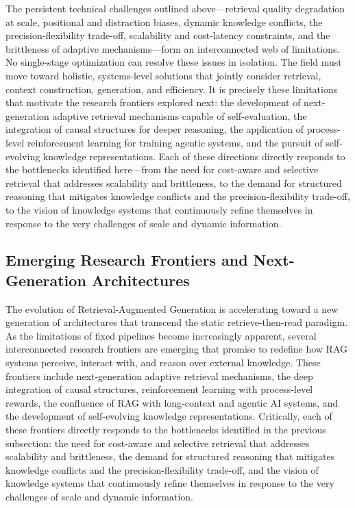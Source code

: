 \documentclass[11pt]{article}
\begin{document}
The persistent technical challenges outlined above---retrieval quality degradation at scale, positional and distraction biases, dynamic knowledge conflicts, the precision-flexibility trade-off, scalability and cost-latency constraints, and the brittleness of adaptive mechanisms---form an interconnected web of limitations. No single-stage optimization can resolve these issues in isolation. The field must move toward holistic, systems-level solutions that jointly consider retrieval, context construction, generation, and efficiency. It is precisely these limitations that motivate the research frontiers explored next: the development of next-generation adaptive retrieval mechanisms capable of self-evaluation, the integration of causal structures for deeper reasoning, the application of process-level reinforcement learning for training agentic systems, and the pursuit of self-evolving knowledge representations. Each of these directions directly responds to the bottlenecks identified here---from the need for cost-aware and selective retrieval that addresses scalability and brittleness, to the demand for structured reasoning that mitigates knowledge conflicts and the precision-flexibility trade-off, to the vision of knowledge systems that continuously refine themselves in response to the very challenges of scale and dynamic information.

\subsection{Emerging Research Frontiers and Next-Generation Architectures}

The evolution of Retrieval-Augmented Generation is accelerating toward a new generation of architectures that transcend the static retrieve-then-read paradigm. As the limitations of fixed pipelines become increasingly apparent, several interconnected research frontiers are emerging that promise to redefine how RAG systems perceive, interact with, and reason over external knowledge. These frontiers include next-generation adaptive retrieval mechanisms, the deep integration of causal structures, reinforcement learning with process-level rewards, the confluence of RAG with long-context and agentic AI systems, and the development of self-evolving knowledge representations. Critically, each of these frontiers directly responds to the bottlenecks identified in the previous subsection: the need for cost-aware and selective retrieval that addresses scalability and brittleness, the demand for structured reasoning that mitigates knowledge conflicts and the precision-flexibility trade-off, and the vision of knowledge systems that continuously refine themselves in response to the very challenges of scale and dynamic information.
\end{document}
